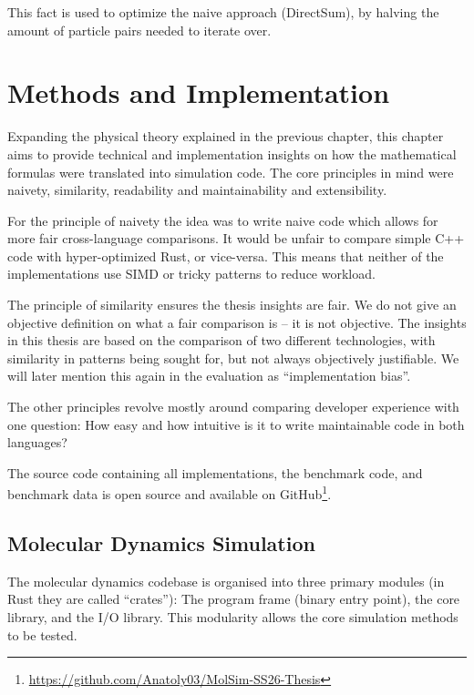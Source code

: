 \documentclass[11pt,
               a4paper,
               bibtotoc,
               idxtotoc,
               headsepline,
               footsepline,
               footexclude,
               BCOR12mm,
               DIV13,
               openany,   %
               ]
               {scrbook}
\begin{document}
This fact is used to optimize the naive approach (DirectSum), by halving the amount of particle pairs needed to iterate over.

\chapter{Methods and Implementation}

Expanding the physical theory explained in the previous chapter, this chapter aims to provide technical and implementation insights on how the mathematical formulas were translated into simulation code. The core principles in mind were naivety, similarity, readability and maintainability and extensibility.

For the principle of naivety the idea was
to write naive code which allows for more fair cross-language comparisons. It would be unfair to compare simple C++ code with hyper-optimized Rust, or vice-versa. This means that neither of the implementations use SIMD or tricky patterns to reduce workload.


The principle of similarity ensures the thesis insights are fair. We do not give an objective definition on what a fair comparison is -- it is not objective. The insights in this thesis are based on the comparison of two different technologies, with similarity in patterns being sought for, but not always objectively justifiable. We will later mention this again in the evaluation as ``implementation bias''.

The other principles revolve mostly around comparing developer experience with one question: How easy and how intuitive is it to write maintainable code in both languages?

The source code containing all implementations, the benchmark code, and benchmark data is open source and available on GitHub\footnote{\url{https://github.com/Anatoly03/MolSim-SS26-Thesis}}.

\section{Molecular Dynamics Simulation}

The molecular dynamics codebase is organised into three primary modules (in Rust they are called ``crates''): The program frame (binary entry point), the core library, and the I/O library. This modularity allows the core simulation methods to be tested.
\end{document}
